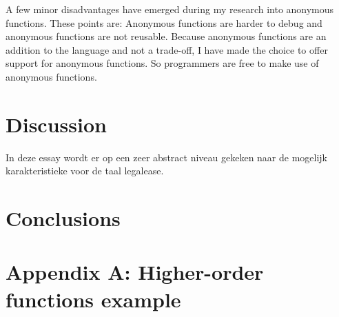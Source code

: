 \documentclass{uva-inf-article}
\begin{document}
\par A few minor disadvantages have emerged during my research into anonymous functions. 
These points are:
Anonymous functions are harder to debug and anonymous functions are not reusable. 
Because anonymous functions are an addition to the language and not a trade-off, 
I have made the choice to offer support for anonymous functions. 
So programmers are free to make use of anonymous functions.

\section{Discussion}
In deze essay wordt er op een zeer abstract niveau gekeken naar de mogelijk karakteristieke 
voor de taal legalease. 

\section{Conclusions}


\printbibliography

\newpage
\section{Appendix A: Higher-order functions example}

\end{document}
